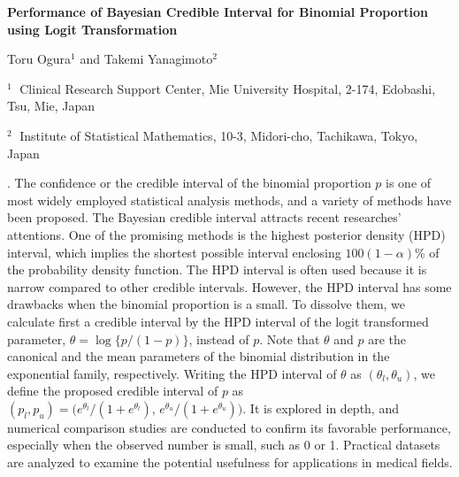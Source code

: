 \documentclass[12pt]{article}
\begin{document}
\begin{flushleft}

{\LARGE\bf Performance of Bayesian Credible Interval for 
Binomial Proportion using Logit Transformation}


\vspace{1.0cm}

Toru Ogura$^1$ and Takemi Yanagimoto$^2$

\begin{description}

\item $^1 \;$ Clinical Research Support Center, Mie University Hospital, 2-174, Edobashi, Tsu, Mie, Japan
\item $^2 \;$ Institute of Statistical Mathematics, 10-3, Midori-cho, Tachikawa, Tokyo, Japan

\end{description}

\end{flushleft}


\vspace{0.75cm}

. 
The confidence or the credible interval of the binomial proportion $p$ is one of most widely employed statistical analysis methods, and a variety of methods have been proposed.
The Bayesian credible interval attracts recent researches' attentions.
One of the promising methods is the highest posterior density (HPD) interval, which implies the shortest possible interval enclosing $100(1-\alpha)$\% of the probability density function.
The HPD interval is often used because it is narrow compared to other credible intervals.
However, the HPD interval has some drawbacks when the binomial proportion is a small.
To dissolve them, we calculate first a credible interval by the HPD interval of the logit transformed parameter, $\theta=\log\{p/(1-p)\}$, instead of $p$.
Note that $\theta$ and $p$ are the canonical and the mean parameters of the binomial distribution in the exponential family, respectively.
Writing the HPD interval of $\theta$ as $(\theta_{l}, \theta_{u})$, we define the proposed credible interval of $p$ as $(p_{l}, p_{u})= \big( e^{\theta_{l}} / ( 1+e^{\theta_{l}} ), \,  e^{\theta_{u}}/(1+e^{\theta_{u}}) \big)$.
It is explored in depth, and numerical comparison studies are conducted to confirm its favorable performance, especially when the observed number is small, such as 0 or 1.
Practical datasets are analyzed to examine the potential usefulness for applications in medical fields.
\end{document}
